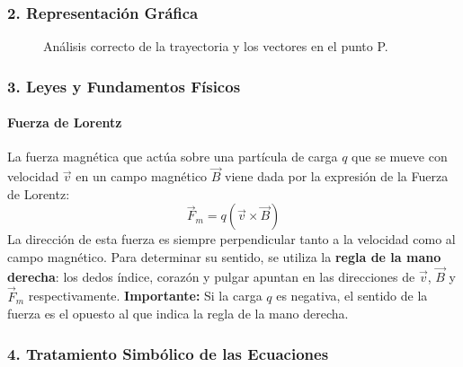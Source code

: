\subsubsection*{2. Representación Gráfica}
\begin{figure}[H]
    \centering
    \caption{Análisis correcto de la trayectoria y los vectores en el punto P.}
\end{figure}

\subsubsection*{3. Leyes y Fundamentos Físicos}
\paragraph*{Fuerza de Lorentz}
La fuerza magnética que actúa sobre una partícula de carga $q$ que se mueve con velocidad $\vec{v}$ en un campo magnético $\vec{B}$ viene dada por la expresión de la Fuerza de Lorentz:
$$ \vec{F}_m = q(\vec{v} \times \vec{B}) $$
La dirección de esta fuerza es siempre perpendicular tanto a la velocidad como al campo magnético. Para determinar su sentido, se utiliza la \textbf{regla de la mano derecha}: los dedos índice, corazón y pulgar apuntan en las direcciones de $\vec{v}$, $\vec{B}$ y $\vec{F}_m$ respectivamente. \textbf{Importante:} Si la carga $q$ es negativa, el sentido de la fuerza es el opuesto al que indica la regla de la mano derecha.

\subsubsection*{4. Tratamiento Simbólico de las Ecuaciones}
